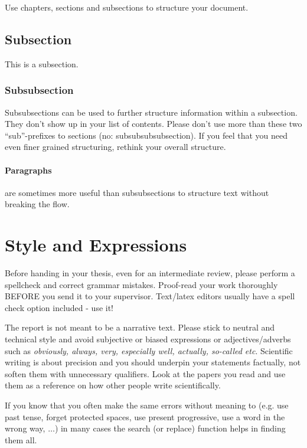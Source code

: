 Use chapters, sections and subsections to structure your document. 

\subsection{Subsection}

This is a subsection. 

\subsubsection{Subsubsection}

Subsubsections can be used to further structure information within a subsection. They don't show up in your list of contents. Please don't use more than these two ``sub''-prefixes to sections (no: subsubsubsubsection). If you feel that you need even finer grained structuring, rethink your overall structure.

\paragraph{Paragraphs} are sometimes more useful than subsubsections to structure text without breaking the flow.


\section{Style and Expressions}

Before handing in your thesis, even for an intermediate review, please perform a spellcheck and correct grammar mistakes. Proof-read your work thoroughly BEFORE you send it to your supervisor. Text/latex editors usually have a spell check option included - use it! 

The report is not meant to be a narrative text. Please stick to neutral and technical style and avoid subjective or biased expressions or adjectives/adverbs such as \emph{obviously, always, very, especially well, actually, so-called etc}. Scientific writing is about precision and you should underpin your statements factually, not soften them with unnecessary qualifiers. Look at the papers you read and use them as a reference on how other people write scientifically.

If you know that you often make the same errors without meaning to (e.g. use past tense, forget protected spaces, use present progressive, use a word in the wrong way, $\ldots$) in many cases the search (or replace) function helps in finding them all.

